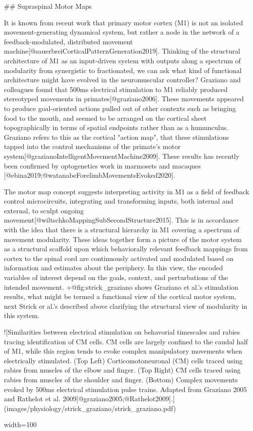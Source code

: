 \documentclass[../main.tex]{subfiles}
\begin{document}
{## Supraspinal Motor Maps

It is known from recent work that primary motor cortex (M1) is not an isolated movement-generating dynamical system, but rather a node in the network of a feedback-modulated, distributed movement machine[@sauerbreiCorticalPatternGeneration2019]. Thinking of the structural architecture of M1 as an input-driven system with outputs along a spectrum of modularity from synergistic to fractionated, we can ask what kind of functional architecture might have evolved in the neuromuscular controller? Graziano and colleagues found that 500ms electrical stimulation to M1 reliably produced stereotyped movements in primates[@graziano2006]. These movements appeared to produce goal-oriented actions pulled out of other contexts such as bringing food to the mouth, and seemed to be arranged on the cortical sheet topographically in terms of spatial endpoints rather than as a humunculus. Graziano refers to this as the cortical "action map", that these stimulations tapped into the control mechanisms of the primate's motor system[@grazianoIntelligentMovementMachine2009]. These results has recently been confirmed by optogenetics work in marmosets and macaques [@ebina2019;@watanabeForelimbMovementsEvoked2020].

The motor map concept suggests interpreting activity in M1 as a field of feedback control microcircuits, integrating and transforming inputs, both internal and external, to sculpt ongoing movement[@wiltschkoMappingSubSecondStructure2015]. This is in accordance with the idea that there is a structural hierarchy in M1 covering a spectrum of movement modularity. These ideas together form a picture of the motor system as a structural scaffold upon which behaviorally relevant feedback mappings from cortex to the spinal cord are continuously activated and modulated based on information and estimates about the periphery. In this view, the encoded variables of interest depend on the goals, context, and perturbations of the intended movement. {+@fig:strick_graziano} shows Graziano et al.'s stimulation results, what might be termed a functional view of the cortical motor system, next Strick er al.'s described above clarifying the structural view of modularity in this system.

![Similarities between electrical stimulation on behavorial timescales and rabies tracing identification of CM cells. CM cells are largely confined to the caudal half of M1, while this region tends to evoke complex manipulatory movements when electrically stimulated. (Top Left) Corticomotoneuronal (CM) cells traced using rabies from muscles of the elbow and finger. (Top Right) CM cells traced using rabies from muscles of the shoulder and finger. (Bottom) Complex movements evoked by 500ms electrical stimulation pulse trains. Adapted from Graziano 2005 and Rathelot et al. 2009[@graziano2005;@Rathelot2009].](images/physiology/strick_graziano/strick_graziano.pdf){width=100%

}}
\end{document}
